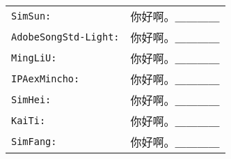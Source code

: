 \documentclass{article}
\def\kenten#1{\texttt{#1:}&{\jfontspec{#1}你好啊。\kern-4\zw ＿＿＿＿}}
\begin{document}
\begin{tabular}{ll}
\kenten{SimSun}\\
\kenten{AdobeSongStd-Light}\\
\kenten{MingLiU}\\
\kenten{IPAexMincho}\\
\kenten{SimHei}\\
\kenten{KaiTi}\\
\kenten{SimFang}\\
\end{tabular}
\end{document}
